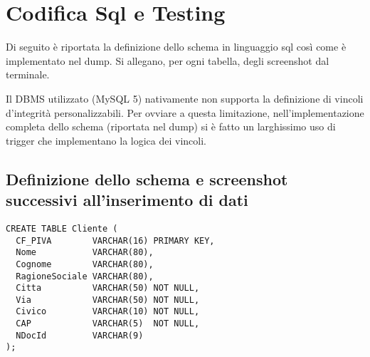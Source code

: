 \section{Codifica Sql e Testing} %
\label{sec:codifica_sql_e_testing}

Di seguito è riportata la definizione dello schema in linguaggio sql così come è implementato nel dump. Si allegano, per ogni tabella, degli screenshot dal terminale.

Il DBMS utilizzato (MySQL 5) nativamente non supporta la definizione di vincoli d'integrità personalizzabili. Per ovviare a questa limitazione, nell'implementazione completa dello schema (riportata nel dump) si è fatto un larghissimo uso di trigger che implementano la logica dei vincoli.

	\subsection{Definizione dello schema e screenshot successivi all'inserimento di dati}
		\begin{lstlisting}
CREATE TABLE Cliente (
  CF_PIVA        VARCHAR(16) PRIMARY KEY,
  Nome           VARCHAR(80),
  Cognome        VARCHAR(80),
  RagioneSociale VARCHAR(80),
  Citta          VARCHAR(50) NOT NULL,
  Via            VARCHAR(50) NOT NULL,
  Civico         VARCHAR(10) NOT NULL,
  CAP            VARCHAR(5)  NOT NULL,
  NDocId         VARCHAR(9)
);
		\end{lstlisting}

